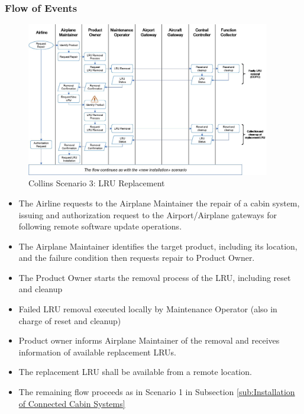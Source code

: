 \subsubsection{Flow of Events}
\begin{figure}
	\begin{center}
		\includegraphics[width=0.95\textwidth]{figures/collins-s3-lru.jpg}
	\end{center}
	\caption{Collins Scenario 3: LRU Replacement}
	\label{fig:collins-s3-lru}
\end{figure}

\begin{itemize}
	\item The Airline requests to the Airplane Maintainer the repair of a cabin system, issuing and authorization
	      request to the Airport/Airplane gateways for following remote software update operations.
	\item The Airplane Maintainer identifies the target product, including its location, and the failure condition
	      then requests repair to Product Owner.
	\item The Product Owner starts the removal process of the LRU, including reset and cleanup
	\item Failed LRU removal executed locally by Maintenance Operator (also in charge of reset and cleanup)
	\item Product owner informs Airplane Maintainer of the removal and receives information of available replacement
	      LRUs.
	\item The replacement LRU shall be available from a remote location.
	\item The remaining flow proceeds as in Scenario 1 in Subsection \ref{sub:Installation of Connected Cabin Systems}

\end{itemize}

